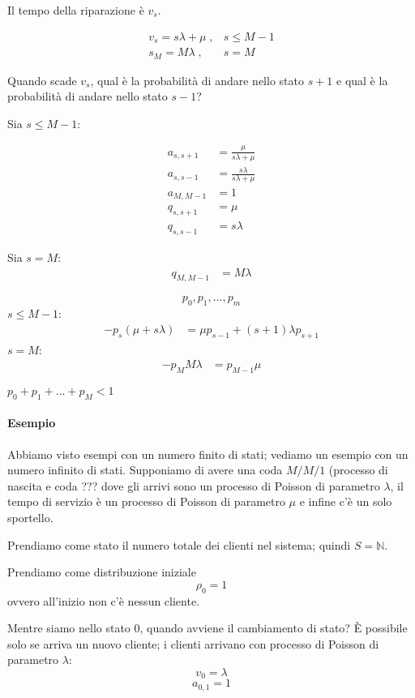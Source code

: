\documentclass[a4paper,12pt]{book}
\begin{document}
Il tempo della riparazione è $ v_s $. 

$$ \begin{array}{cc}
	v_s = s\lambda + \mu \; , & s \le M-1 \\
	s_M = M \lambda \; , & s = M
\end{array} $$

Quando scade $ v_s $, qual è la probabilità di andare nello stato $ s+1 $ e qual è la probabilità di andare nello stato $ s-1 $?

Sia $ s \le M-1 $:

\begin{align*}
	a_{s,s+1} & = \frac{\mu}{s\lambda + \mu} \\
	a_{s,s-1} & = \frac{s\lambda}{s\lambda + \mu} \\
	a_{M, M-1} & = 1 \\
	q_{s,s+1} & = \mu \\
	q_{s,s-1} & = s\lambda
\end{align*}

Sia $ s = M $:
\begin{align*}
	q_{M, M-1} & = M\lambda 
\end{align*}

$$ 	p_0, p_1, ..., p_m  $$ %
$ 	s \le M-1 $:
\begin{align*}
	-p_s(\mu  +s\lambda) & = \mu p_{s-1} + (s+1)\lambda p_{s+1} 
\end{align*}
$ 	s = M $:
\begin{align*}
	-p_M M \lambda & = p_{M-1} \mu 
\end{align*}

$ 	p_0 + p_1 + ... + p_M < 1 $

\paragraph{Esempio}
Abbiamo visto esempi con un numero finito di stati; vediamo un esempio con un numero infinito di stati. Supponiamo di avere una coda $ M/M/1 $ (processo di nascita e coda ??? %
dove gli arrivi sono un processo di Poisson di parametro $\lambda$, il tempo di servizio è un processo di Poisson di parametro $\mu$ e infine c'è un solo sportello. 

Prendiamo come stato il numero totale dei clienti nel sistema; quindi $ S = \mathbb{N} $. 

Prendiamo come distribuzione iniziale
$$ \rho_0 = 1$$
ovvero all'inizio non c'è nessun cliente. 

Mentre siamo nello stato $ 0 $, quando avviene il cambiamento di stato? È possibile solo se arriva un nuovo cliente; i clienti arrivano con processo di Poisson di parametro $\lambda$:
$$ v_0 = \lambda $$
$$ a_{0,1} = 1 $$
\end{document}
